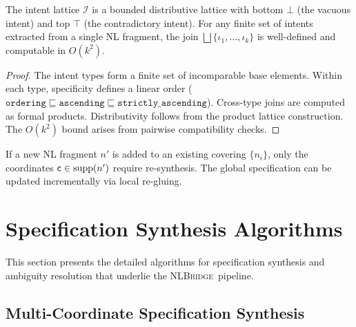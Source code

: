 \documentclass[11pt]{article}
\newcommand{\NLBridge}{\textsc{NLBridge}}
\newcommand{\IntentLattice}{\mathcal{I}}
\begin{document}
\begin{lemma}\label{lem:lattice-wf}
The intent lattice $\IntentLattice$ is a bounded distributive lattice
with bottom $\bot$ (the vacuous intent) and top $\top$ (the
contradictory intent).  For any finite set of intents extracted from
a single NL fragment, the join $\bigsqcup \{\iota_1, \ldots,
\iota_k\}$ is well-defined and computable in $O(k^2)$.
\end{lemma}

\begin{proof}
The intent types form a finite set of incomparable base elements.
Within each type, specificity defines a linear order (\eg
$\texttt{ordering} \sqsubseteq \texttt{ascending} \sqsubseteq
\texttt{strictly\_ascending}$).  Cross-type joins are computed as
formal products.  Distributivity follows from the product lattice
construction.  The $O(k^2)$ bound arises from pairwise compatibility
checks.
\end{proof}

\begin{corollary}\label{cor:incremental}
If a new NL fragment $n'$ is added to an existing covering
$\{n_i\}$, only the coordinates $\mathsf{c} \in \mathrm{supp}(n')$ require
re-synthesis.  The global specification can be updated incrementally
via local re-gluing.
\end{corollary}

\section{Specification Synthesis Algorithms}\label{sec:synth-alg}

This section presents the detailed algorithms for specification
synthesis and ambiguity resolution that underlie the \NLBridge\
pipeline.

\subsection{Multi-Coordinate Specification Synthesis}
\end{document}
